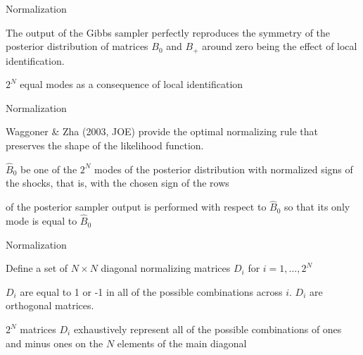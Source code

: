 \documentclass[notes,blackandwhite,mathsans,usenames,dvipsnames]{beamer}
\begin{document}
\begin{frame}{Normalization}

{\color{mcxs2}The output of the Gibbs sampler perfectly reproduces {\color{purple}the symmetry of the posterior distribution} of matrices} $B_0$ {\color{mcxs2}and} $B_+$ {\color{purple}around zero} {\color{mcxs2}being the effect of local identification. }

 $2^N$ {\color{purple}equal modes} {\color{mcxs2}as a consequence of local identification}




\end{frame}


\begin{frame}{Normalization}

Waggoner \& Zha (2003, JOE) {\color{mcxs2}provide the optimal normalizing rule that preserves the shape of the likelihood function. }

 $\widehat{B}_0$ {\color{mcxs2}be one of the} $2^N$ {\color{mcxs2}modes of the posterior distribution with normalized signs of the shocks, that is, with the chosen sign of the rows}

 {\color{mcxs2}of the posterior sampler output is performed with respect to} $\widehat{B}_0$ {\color{mcxs2}so that its only mode is equal to} $\widehat{B}_0$


\end{frame}



\begin{frame}{Normalization}

{\color{mcxs2}Define a set of} $N\times N$ {\color{mcxs2}diagonal normalizing matrices} $D_i$ {\color{mcxs2}for} $i = 1,\dots , 2^N$

 $D_i$ {\color{mcxs2}are equal to} 1 {\color{mcxs2}or} -1 {\color{mcxs2}in all of the possible combinations across} $i$. $D_i$ {\color{mcxs2}are orthogonal matrices.}

 $2^N$ {\color{mcxs2}matrices} $D_i$ {\color{mcxs2}exhaustively represent all of the possible combinations of ones and minus ones on the} $N$ {\color{mcxs2}elements of the main diagonal}

\end{frame}
\end{document}
